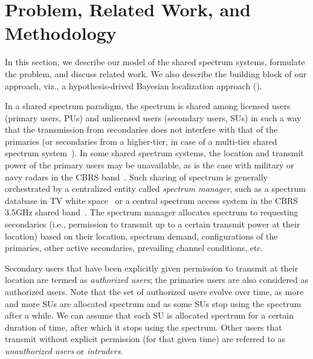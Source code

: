 \section{Problem, Related Work, and Methodology}
\label{sec:ipsn-problem}

In this section, we describe our model of the shared spectrum systems,
formulate the \mtl problem, and discuss related work.  We also
describe the building block of our approach, viz., a hypothesis-drived
Bayesian localization approach (\map).

 In a shared spectrum paradigm, the
spectrum is shared among licensed users (primary users, PUs) and
unlicensed users (secondary users, SUs) in such a way that the
transmission from secondaries does not interfere with that of the
primaries (or secondaries from a higher-tier, in case of a multi-tier
shared spectrum system~\cite{scte-isbe16-cbrs}). In some shared spectrum systems,
the location and transmit power of the primary users may be
unavailable, as is the case with military or navy radars in the CBRS
band~\cite{scte-isbe16-cbrs}.
Such sharing of spectrum is generally orchestrated by a centralized
entity called {\em spectrum manager}, such as a spectrum
database in TV white
space~\cite{sas-paper} or a central spectrum access system in
the CBRS 3.5GHz shared band~\cite{milind2015dyspan}. The spectrum
manager allocates spectrum to requesting secondaries (i.e., permission
to transmit up to a certain transmit power at their location) based on
their location, spectrum demand, configurations of the primaries, other
active secondaries, prevailing channel conditions, etc.

Secondary users that have been explicitly given permission to transmit
at their location are termed as {\em authorized users}; the primaries
users are also considered as authorized users. Note that the set of
authorized users evolve over time, as more and more SUs are allocated
spectrum and as some SUs stop using the spectrum after a while. We can
assume that each SU is allocated spectrum for a certain duration of
time, after which it stops using the spectrum. 
Other users that transmit without explicit permission (for that given
time) are referred to as {\em unauthorized users} or {\em intruders}.

